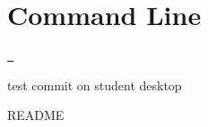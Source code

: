 \chapter{Command Line}
\hypertarget{md__read_me}{}\label{md__read_me}
\label{md__read_me_autotoc_md0}%
%




\href{https://codecov.io/gh/COSC345-CommandLine/commandLine}{\texttt{ }}

test commit on student desktop

README 